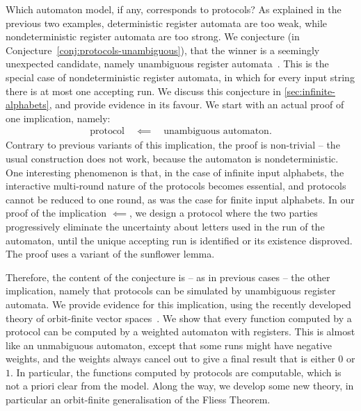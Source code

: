 Which automaton model, if any, corresponds to protocols? As explained in the previous two examples, deterministic register automata are too weak, while nondeterministic register automata are too strong.
We conjecture (in Conjecture~\ref{conj:protocols-unambiguous}), that the winner is a seemingly  unexpected candidate, namely unambiguous register automata~\cite[Section 5]{colcombet2015unambiguity}. This is the special case of  nondeterministic register automata, in which for every input string there is at most one accepting run.
We discuss this conjecture in \cref{sec:infinite-alphabets}, and provide evidence in its favour. We start with an actual proof of one implication, namely:
\begin{align*}
\text{protocol} \quad \impliedby \quad \text{unambiguous automaton}.
\end{align*}
Contrary to  previous variants of this implication, the proof is non-trivial -- the usual construction does not work, because the automaton is nondeterministic. One  interesting phenomenon is that, in the case of infinite input alphabets, the interactive multi-round nature of the protocols becomes essential, and protocols cannot be reduced to one round, as was the case for finite input alphabets. In our proof of the implication $\impliedby$, we design a protocol where  the two parties  progressively eliminate the uncertainty about letters used in the run of the automaton, until the unique accepting run is identified or its existence disproved.
The proof uses a variant of the sunflower lemma.

Therefore,  the content of the conjecture is -- as in previous cases --  the other implication, namely that protocols can be simulated by unambiguous register automata. We provide evidence for this implication, using the recently developed theory of orbit-finite vector spaces~\cite{orbitFiniteVectorTheoretics}. We show that every function computed by a protocol can be computed by a weighted automaton with registers. This is almost like an unmabiguous automaton, except that some runs might have negative weights, and the weights always cancel out to give a final result that is either $0$ or $1$. In particular, the functions computed by protocols are computable, which is not a priori clear from the model. Along the way, we develop some new theory, in particular an orbit-finite generalisation of the Fliess Theorem. 

